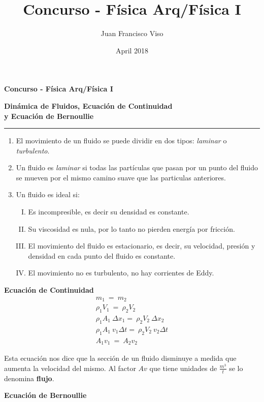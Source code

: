 \documentclass{article}
\author{Juan Francisco Viso	}
\title{Concurso - Física Arq/Física I}
\date{April 2018}
\begin{document}
\begin{center}
{\huge \textbf{Concurso - Física Arq/Física I} \par}
{\LARGE \textbf{Dinámica de Fluidos, Ecuación de Continuidad\\ y Ecuación de Bernoullie} \par}
\rule{\linewidth}{.3pt}
\end{center}

\begin{enumerate}
\item El movimiento de un fluido se puede dividir en dos tipos: \textit{laminar} o \textit{turbulento}.
\item Un fluido es \textit{laminar} si todas las partículas que pasan por un punto del fluido se mueven por el mismo camino suave que las particulas anteriores.
\item Un fluido es ideal si:
\begin{enumerate}[I.]
\item Es incompresible, es decir su densidad es constante.
\item Su viscosidad es nula, por lo tanto no pierden energía por fricción.
\item El movimiento del fluido es estacionario, es decir, su velocidad, presión y densidad en cada punto del fluido es constante.
\item El movimiento no es turbulento, no hay corrientes de Eddy.
\end{enumerate}
\end{enumerate}

\large{\textbf{Ecuación de Continuidad}}
\begin{gather*}
m_1\ =\ m_2 \\
\rho_1 V_1\ =\ \rho_2 V_2\ \\
\rho_1 A_1\ \Delta x_1 =\ \rho_2 V_2\ \Delta x_2 \\
\rho_1 A_1\ v_1 \Delta t =\ \rho_2 V_2\ v_2 \Delta t \\
A_1 v_1\ =\ A_2 v_2
\end{gather*}

Esta ecuación nos dice que la sección de un fluido disminuye a medida que aumenta la velocidad del mismo. Al factor $Av$ que tiene unidades de $\frac{m^3}{t}$ se lo denomina \textbf{flujo}.

\vspace{0.5cm}
\large{\textbf{Ecuación de Bernoullie}}
\end{document}
